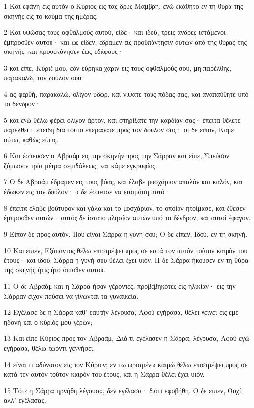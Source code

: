 \par 1 Και εφάνη εις αυτόν ο Κύριος εις τας δρυς Μαμβρή, ενώ εκάθητο εν τη θύρα της σκηνής εις το καύμα της ημέρας.
\par 2 Και υψώσας τους οφθαλμούς αυτού, είδε· και ιδού, τρεις άνδρες ιστάμενοι έμπροσθεν αυτού· και ως είδεν, έδραμεν εις προϋπάντησιν αυτών από της θύρας της σκηνής, και προσεκύνησεν έως εδάφους·
\par 3 και είπε, Κύριέ μου, εάν εύρηκα χάριν εις τους οφθαλμούς σου, μη παρέλθης, παρακαλώ, τον δούλον σου·
\par 4 ας φερθή, παρακαλώ, ολίγον ύδωρ, και νίψατε τους πόδας σας, και αναπαύθητε υπό το δένδρον·
\par 5 και εγώ θέλω φέρει ολίγον άρτον, και στηρίξατε την καρδίαν σας· έπειτα θέλετε παρέλθει· επειδή διά τούτο επεράσατε προς τον δούλον σας· οι δε είπον, Κάμε ούτω, καθώς είπας.
\par 6 Και έσπευσεν ο Αβραάμ εις την σκηνήν προς την Σάρραν και είπε, Σπεύσον ζύμωσον τρία μέτρα σεμιδάλεως, και κάμε εγκρυφίας.
\par 7 Ο δε Αβραάμ έδραμεν εις τους βόας, και έλαβε μοσχάριον απαλόν και καλόν, και έδωκεν εις τον δούλον· ο δε έσπευσε να ετοιμάση αυτό·
\par 8 έπειτα έλαβε βούτυρον και γάλα και το μοσχάριον, το οποίον ητοίμασε, και έθεσεν έμπροσθεν αυτών· αυτός δε ίστατο πλησίον αυτών υπό το δένδρον, και αυτοί έφαγον.
\par 9 Είπον δε προς αυτόν, Που είναι Σάρρα η γυνή σου; Ο δε είπεν, Ιδού, εν τη σκηνή.
\par 10 Και είπεν, Εξάπαντος θέλω επιστρέψει προς σε κατά τον αυτόν τούτον καιρόν του έτους· και ιδού, Σάρρα η γυνή σου θέλει έχει υιόν. Η δε Σάρρα ήκουσεν εν τη θύρα της σκηνής ήτις ήτο όπισθεν αυτού.
\par 11 Ο δε Αβραάμ και η Σάρρα ήσαν γέροντες, προβεβηκότες εις ηλικίαν· εις την Σάρραν είχον παύσει να γίνωνται τα γυναικεία.
\par 12 Εγέλασε δε η Σάρρα καθ' εαυτήν λέγουσα, Αφού εγήρασα, θέλει γείνει εις εμέ ηδονή και ο κύριός μου γέρων;
\par 13 Και είπε Κύριος προς τον Αβραάμ, Διά τι εγέλασεν η Σάρρα, λέγουσα, Αφού εγώ εγήρασα, θέλω τωόντι γεννήσει;
\par 14 είναι τι αδύνατον εις τον Κύριον; εν τω ωρισμένω καιρώ θέλω επιστρέψει προς σε κατά τον αυτόν τούτον καιρόν του έτους, και η Σάρρα θέλει έχει υιόν.
\par 15 Τότε η Σάρρα ηρνήθη λέγουσα, δεν εγέλασα· διότι εφοβήθη. Ο δε είπεν, Ουχί, αλλ' εγέλασας.
